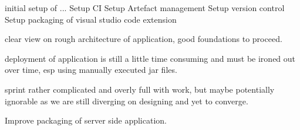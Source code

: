 
initial setup of ... 
Setup CI
Setup Artefact management
Setup version control
Setup packaging of visual studio code extension

clear view on rough architecture of application, good foundations to proceed.


deployment of application is still a little time consuming and must be ironed out over time, 
esp using manually executed jar files.

sprint rather complicated and overly full with work, but maybe potentially ignorable as we are still diverging on designing and yet to converge.


Improve packaging of server side application.